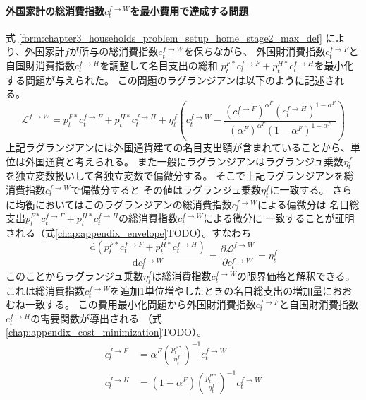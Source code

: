 \paragraph{外国家計の総消費指数\(c_t^{f\to W}\)を最小費用で達成する問題}
\label{sec:chapter3_households_stage1b_foreign_c_f_W_problem}
式
\eqref{form:chapter3_households_problem_setup_home_stage2_max_def}
により、外国家計\(f\)が所与の総消費指数\(c_t^{f\to W}\)を保ちながら、
外国財消費指数\(c_t^{f\to F}\)と自国財消費指数\(c_t^{f\to H}\)を調整して名目支出の総和
\(p_t^{F*}c_t^{f\to F}+p_t^{H*}c_t^{f\to H}\)を最小化する問題が与えられた。
この問題のラグランジアンは以下のように記述される。
\begin{equation}
\label{form:chapter3_households_stage1b_foreign_c_f_W_problem_lagrangian_def}
    \mathcal{L}^{f\to W}=p_t^{F*}c_t^{f\to F}+p_t^{H*}c_t^{f\to H}+\eta_t^f\left(c_t^{f\to W}-\frac{(c_t^{f\to F})^{\alpha^F}(c_t^{f\to H})^{1-\alpha^F}}{(\alpha^F)^{\alpha^F}(1-\alpha^F)^{1-\alpha^F}}\right)
\end{equation}
上記ラグランジアンには外国通貨建ての名目支出額が含まれていることから、単位は外国通貨と考えられる。
また一般にラグランジアンはラグランジュ乗数\(\eta_t^f\)を独立変数扱いして各独立変数で偏微分する。
そこで上記ラグランジアンを総消費指数\(c_t^{f\to W}\)で偏微分すると
その値はラグランジュ乗数\(\eta_t^f\)に一致する。
さらに均衡においてはこのラグランジアンの総消費指数\(c_t^{f\to W}\)による偏微分は
名目総支出\(p_t^{F*}c_t^{f\to F}+p_t^{H*}c_t^{f\to H}\)の総消費指数\(c_t^{f\to W}\)による微分に
一致することが証明される（式\eqref{chap:appendix_envelope}TODO）。すなわち
\begin{equation}
\label{form:chapter3_households_stage1b_foreign_c_f_W_problem_eta_f_marginal_eq}
    \frac{\mathrm{d}(p_t^{F*}c_t^{f\to F}+p_t^{H*}c_t^{f\to H})}{\mathrm{d}c_t^{f\to W}}=\frac{\partial \mathcal{L}^{f\to W}}{\partial c_t^{f\to W}}=\eta_t^f
\end{equation}
このことからラグランジュ乗数\(\eta_t^f\)は総消費指数\(c_t^{f\to W}\)の限界価格と解釈できる。
これは総消費指数\(c_t^{f\to W}\)を追加1単位増やしたときの名目総支出の増加量におおむね一致する。
この費用最小化問題から外国財消費指数\(c_t^{f\to F}\)と自国財消費指数\(c_t^{f\to H}\)の需要関数が導出される
（式\eqref{chap:appendix_cost_minimization}TODO）。
\begin{align}
    \label{form:chapter3_households_stage1b_foreign_c_f_W_problem_c_f_F_eq}
        c_t^{f\to F}&=\alpha^F\left(\frac{p_t^{F*}}{\eta_t^f}\right)^{-1}c_t^{f\to W} \\
    \label{form:chapter3_households_stage1b_foreign_c_f_H_eq}
        c_t^{f\to H}&=(1-\alpha^F)\left(\frac{p_t^{H*}}{\eta_t^f}\right)^{-1}c_t^{f\to W}
\end{align}
